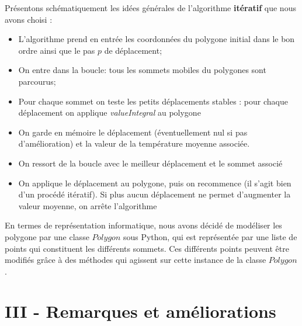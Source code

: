 \documentclass[a4paper,reqno]{article}
\begin{document}
\par Présentons schématiquement les idées générales de l'algorithme \textbf{itératif} que nous avons choisi : \vspace{0.3cm}

\begin{itemize}
	\item L'algorithme prend en entrée les coordonnées du polygone initial dans le bon ordre ainsi que le pas $p$ de déplacement;
	\item On entre dans la boucle: tous les sommets mobiles du polygones sont parcourus;
	\item Pour chaque sommet on teste les  petits déplacements stables : pour chaque déplacement on applique \textit{valueIntegral} au polygone
	\item On garde en mémoire le déplacement (éventuellement nul si pas d'amélioration) et la valeur de la température moyenne associée. 
	\item On ressort de la boucle avec le meilleur déplacement et le sommet associé
	\item On applique le déplacement au polygone, puis on recommence (il s'agit bien d'un procédé itératif). Si plus aucun déplacement ne permet d'augmenter la valeur moyenne, on arrête l'algorithme
\end{itemize}
\par En termes de représentation informatique, nous avons décidé de modéliser les polygone par une classe $Polygon$ sous Python, qui est représentée par une liste de points qui constituent les différents sommets. Ces différents points peuvent être modifiés grâce à des méthodes qui agissent sur cette instance de la classe $Polygon$. \\

\section*{III - Remarques et améliorations}
\end{document}
